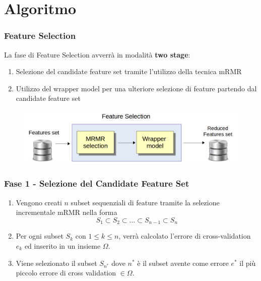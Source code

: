 \documentclass{beamer}
\begin{document}
\section{Algoritmo}
\begin{frame}
	\frametitle{Feature Selection}
	La fase di Feature Selection avverrà in modalità \textbf{two stage}:
	\begin{enumerate}
		\item Selezione del candidate feature set tramite l'utilizzo della tecnica mRMR
		\item Utilizzo del wrapper model per una ulteriore selezione di feature partendo dal candidate feature set
	\end{enumerate}
	\begin{figure}[htb]
		\includegraphics[width=.9\textwidth]{figure/twostage.png}
	\end{figure}
\end{frame}
\begin{frame}
	\frametitle{Fase 1 - Selezione del Candidate Feature Set}
	\begin{enumerate}
		\item Vengono creati $n$ subset sequenziali di feature tramite la selezione incrementale mRMR nella forma
		$$S_1 \subset S_2 \subset \dots \subset S_{n-1} \subset S_n $$
		\item Per ogni subset $S_k$ con $1 \leq k \leq n$, verrà calcolato l'errore di cross-validation $e_k$ ed inserito in un insieme $\Omega$.
		\item Viene selezionato il subset $S_{n^*}$ dove $n^*$ è il subset avente come errore $e^*$ il più piccolo errore di cross validation $\in \Omega$.
	\end{enumerate}
\end{frame}
\end{document}

